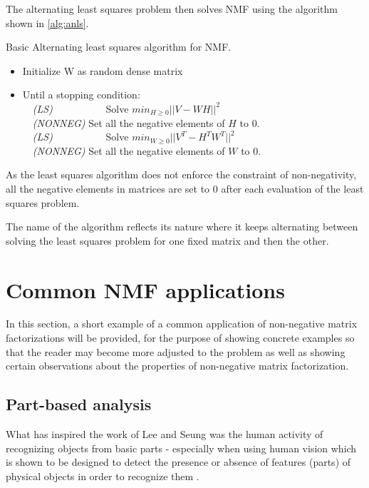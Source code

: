 \documentclass[thesis=M,english]{FITthesis}[2012/10/20]
\begin{document}
The alternating least squares problem then solves NMF using the algorithm
shown in \ref{alg:anls}.

\begin{algorithm}[h]
  \caption{Basic Alternating least squares algorithm for NMF. \cite{nmf-anls}}
  \label{alg:anls}
  \begin{itemize}
    \item Initialize W as random dense matrix\\
    \item Until a stopping condition:\\
    ~~\emph{(LS)} ~~~~~~~~~~Solve $min_{H \geq 0}||V - WH||^{2}$\\
    ~~\emph{(NONNEG)} Set all the negative elements of $H$ to $0$.\\
    ~~\emph{(LS)} ~~~~~~~~~~Solve $min_{W \geq 0}||V^{T} - H^{T}W^{T}||^{2}$\\
    ~~\emph{(NONNEG)} Set all the negative elements of $W$ to $0$.\\
  \end{itemize}
\end{algorithm}

As the least squares algorithm does not enforce the constraint of non-negativity,
all the negative elements in matrices are set to $0$ after each evaluation of
the least squares problem.

The name of the algorithm reflects its nature where it keeps alternating between
solving the least squares problem for one fixed matrix and then the other.


\section{Common NMF applications}
In this section, a short example of a common application of non-negative matrix
factorizations will be provided, for the purpose of showing concrete examples
so that the reader may become more adjusted to the problem as well as showing
certain observations about the properties of non-negative matrix factorization.


\subsection{Part-based analysis}
What has inspired the work of Lee and Seung \cite{lee99} was the human activity
of recognizing objects from basic parts - especially when using human vision which
is shown to be designed to detect the presence or absence of features (parts)
of physical objects in order to recognize them \cite{component-recognition}.
\end{document}

